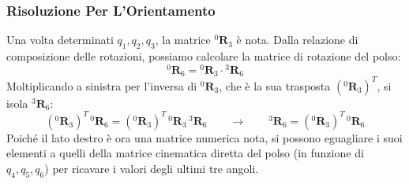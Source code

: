 ﻿\documentclass[11pt, a4paper]{article}
\begin{document}
\subsubsection*{Risoluzione Per L'Orientamento}
Una volta determinati $q_1, q_2, q_3$, la matrice ${}^0\mathbf{R}_3$ è nota. Dalla relazione di composizione delle rotazioni, possiamo calcolare la matrice di rotazione del polso:
\[
    {}^0\mathbf{R}_6 = {}^0\mathbf{R}_3 \cdot {}^3\mathbf{R}_6
\]
Moltiplicando a sinistra per l'inversa di ${}^0\mathbf{R}_3$, che è la sua trasposta $({}^0\mathbf{R}_3)^{T}$, si isola ${}^3\mathbf{R}_6$:
\[
    ({}^0\mathbf{R}_3)^{T} \, {}^0\mathbf{R}_6 = ({}^0\mathbf{R}_3)^{T} \, {}^0\mathbf{R}_3 \, {}^3\mathbf{R}_6
    \qquad\longrightarrow\qquad
    {}^3\mathbf{R}_6 = ({}^0\mathbf{R}_3)^{T} \, {}^0\mathbf{R}_6
\]
Poiché il lato destro è ora una matrice numerica nota, si possono eguagliare i suoi elementi a quelli della matrice cinematica diretta del polso (in funzione di $q_4, q_5, q_6$) per ricavare i valori degli ultimi tre angoli.
\end{document}

